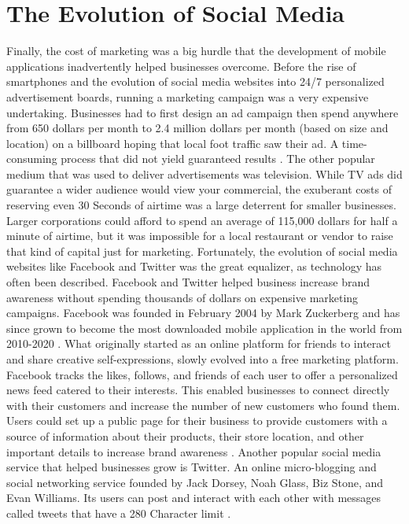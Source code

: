 \documentclass{article}
\begin{document}
\section{The Evolution of Social Media}
Finally, the cost of marketing was a big hurdle that the development of mobile applications inadvertently helped businesses overcome. Before the rise of smartphones and the evolution of social media websites into 24/7 personalized advertisement boards, running a marketing campaign was a very expensive undertaking. Businesses had to first design an ad campaign then spend anywhere from 650 dollars per month to 2.4 million dollars per month (based on size and location) on a billboard hoping that local foot traffic saw their ad. A time-consuming process that did not yield guaranteed results \cite{siemasko_2013}. The other popular medium that was used to deliver advertisements was television. While TV ads did guarantee a wider audience would view your commercial, the exuberant costs of reserving even 30 Seconds of airtime was a large deterrent for smaller businesses. Larger corporations could afford to spend an average of 115,000 dollars for half a minute of airtime, but it was impossible for a local restaurant or vendor to raise that kind of capital just for marketing. Fortunately, the evolution of social media websites like Facebook and Twitter was the great equalizer, as technology has often been described. Facebook and Twitter helped business increase brand awareness without spending thousands of dollars on expensive marketing campaigns. Facebook was founded in February 2004 by Mark Zuckerberg and has since grown to become the most downloaded mobile application in the world from 2010-2020 \cite{miller_2019}. What originally started as an online platform for friends to interact and share creative self-expressions, slowly evolved into a free marketing platform. Facebook tracks the likes, follows, and friends of each user to offer a personalized news feed catered to their interests. This enabled businesses to connect directly with their customers and increase the number of new customers who found them. Users could set up a public page for their business to provide customers with a source of information about their products, their store location, and other important details to increase brand awareness \cite{news_2014}. Another popular social media service that helped businesses grow is Twitter. An online micro-blogging and social networking service founded by Jack Dorsey, Noah Glass, Biz Stone, and Evan Williams. Its users can post and interact with each other with messages called tweets that have a 280 Character limit \cite{reiff_2021}.
\end{document}
